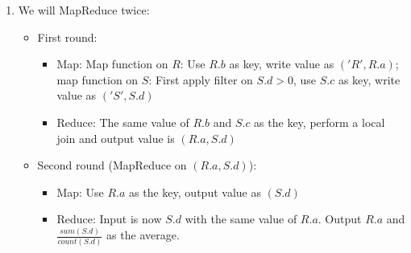 \documentclass[10pt]{myland}
\begin{document}
\begin{enumerate}[label=\textbf{\arabic*.}, listparindent=0.0em, itemsep=1em]
\begin{center}
{
    }
    \end{center}
    \item We will MapReduce twice:
        \begin{itemize}
            \item First round:
                \begin{itemize}
                    \item Map: Map function on $R$: Use $R.b$ as key, write value as $('R', R.a)$; map function on $S$:
                        First apply filter on $S.d > 0$, use $S.c$ as key, write value as $('S', S.d)$
                    \item Reduce: The same value of $R.b$ and $S.c$ as the key, perform a local join and output value is
                        $(R.a, S.d)$
                \end{itemize}
            \item Second round (MapReduce on $(R.a, S.d)$):
                \begin{itemize}
                    \item Map: Use $R.a$ as the key, output value as $(S.d)$
                    \item Reduce: Input is now $S.d$ with the same value of $R.a$. Output $R.a$ and $\frac{sum(S.d)}{count(S.d)}$
                        as the average.
                \end{itemize}
        \end{itemize}
\end{enumerate}
\end{document}
